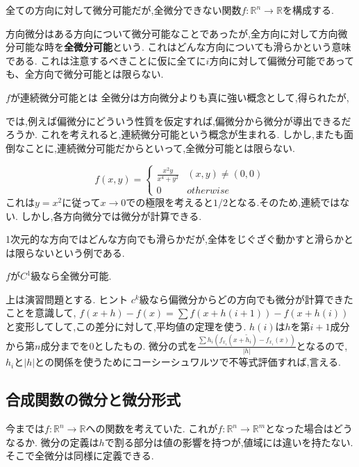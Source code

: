 \begin{epl}
全ての方向に対して微分可能だが,全微分できない関数$f:\mathbb{R}^n \to \mathbb{R}$を構成する.
\end{epl}
方向微分はある方向について微分可能なことであったが,全方向に対して方向微分可能な時を\textbf{全微分可能}という.
これはどんな方向についても滑らかという意味である.
これは注意するべきことに仮に全てに$i$方向に対して偏微分可能であっても、全方向で微分可能とは限らない.

$f$が連続微分可能とは
全微分は方向微分よりも真に強い概念として,得られたが,

では,例えば偏微分にどういう性質を仮定すれば,偏微分から微分が導出できるだろうか.
これを考えれると,連続微分可能という概念が生まれる.
しかし,またも面倒なことに,連続微分可能だからといって,全微分可能とは限らない.
\begin{epl}
  \begin{equation*}
   f(x, y)  = \begin{cases}
   \frac{x^2y}{x^4 + y^2} & (x,y)\neq (0, 0) \\
    0 & otherwise
 \end{cases}
\end{equation*}
これは$y = x^2$に従って$x \to 0$での極限を考えると$1/2$となる.そのため,連続ではない.
しかし,各方向微分では微分が計算できる.
\end{epl}
\begin{rem}
1次元的な方向ではどんな方向でも滑らかだが,全体をじぐざぐ動かすと滑らかとは限らないという例である.
\end{rem}

\begin{prop}
 $f$が$C^1$級なら全微分可能.
\end{prop}
上は演習問題とする.
ヒント
$c^k$級なら偏微分からどの方向でも微分が計算できたことを意識して,
$f(x+h)-f(x) = \sum f(x + h(i+1)) -f(x +h(i))$と変形してして,この差分に対して,平均値の定理を使う.
$h(i)$は$h$を第$i+1$成分から第$n$成分までを$0$としたもの.
微分の式を$\frac{\sum h_i (f_{x_i}(x + \tilde{h}_i) - f_{x_i}(x))}{|h|}$となるので,
$h_i$と$|h|$との関係を使うためにコーシーシュワルツで不等式評価すれば,言える.

\subsection{合成関数の微分と微分形式}
今までは$f: \mathbb{R}^n \to \mathbb{R}$への関数を考えていた.
これが$f: \mathbb{R}^n \to \mathbb{R}^m$となった場合はどうなるか.
微分の定義は$h$で割る部分は値の影響を持つが,値域には違いを持たない.
そこで全微分は同様に定義できる.

